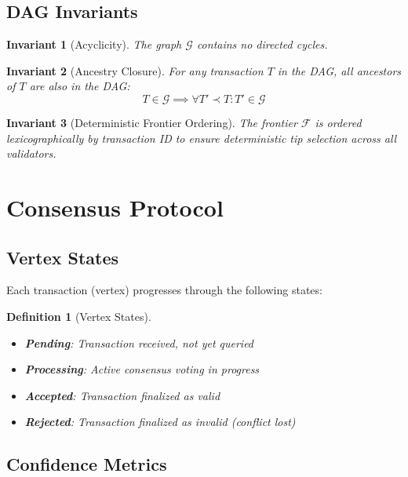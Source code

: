 \documentclass[11pt,a4paper]{article}
\newtheorem{definition}{Definition}
\newtheorem{invariant}{Invariant}
\begin{document}
\subsection{DAG Invariants}

\begin{invariant}[Acyclicity]
The graph $\mathcal{G}$ contains no directed cycles.
\end{invariant}

\begin{invariant}[Ancestry Closure]
For any transaction $T$ in the DAG, all ancestors of $T$ are also in the DAG:
\begin{equation}
T \in \mathcal{G} \implies \forall T' \prec T : T' \in \mathcal{G}
\end{equation}
\end{invariant}

\begin{invariant}[Deterministic Frontier Ordering]
The frontier $\mathcal{F}$ is ordered lexicographically by transaction ID to ensure deterministic tip selection across all validators.
\end{invariant}

\section{Consensus Protocol}

\subsection{Vertex States}

Each transaction (vertex) progresses through the following states:

\begin{definition}[Vertex States]
\begin{itemize}
    \item \textbf{Pending}: Transaction received, not yet queried
    \item \textbf{Processing}: Active consensus voting in progress
    \item \textbf{Accepted}: Transaction finalized as valid
    \item \textbf{Rejected}: Transaction finalized as invalid (conflict lost)
\end{itemize}
\end{definition}

\subsection{Confidence Metrics}
\end{document}
